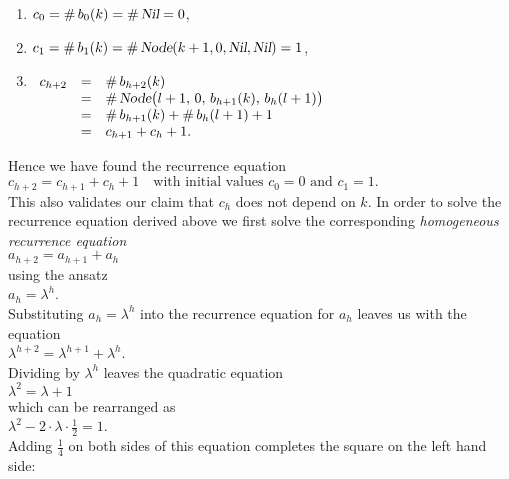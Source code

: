 \begin{enumerate}
\item $c_0 = \#\, b_0(k) = \#\, \textsl{Nil} = 0$,
\item $c_1 = \#\, b_1(k) = \#\, \textsl{Node}(k+1,0,\textsl{Nil}, \textsl{Nil}) = 1$, 
\item$\begin{array}[t]{lcl}
       c_{h+2} & = & \#\, b_{h+2}(k) \\
               & = & \#\,\textsl{Node}\bigl(l+1,\,0,\,b_{h+1}(k),\,b_h(l+1)\bigr) \\
               & = & \#\, b_{h+1}(k) + \#\, b_h(l+1) + 1 \\
               & = & c_{h+1} + c_h + 1.
       \end{array}$
\end{enumerate}
Hence we have found the recurrence equation 
\\[0.2cm]
\hspace*{1.3cm}
$c_{h+2} = c_{h+1} + c_h + 1 \quad \mbox{with initial values $c_0 = 0$ and $c_1 = 1$}.$
\\[0.2cm]
This also validates our claim that $c_h$ does not depend on $k$.  In order to solve the recurrence
equation derived above we first solve the corresponding \emph{homogeneous recurrence equation} 
\\[0.2cm]
\hspace*{1.3cm}
$a_{h+2} = a_{h+1} + a_h$
\\[0.2cm]
using the  ansatz
\\[0.2cm]
\hspace*{1.3cm}
$a_h = \lambda^h$.
\\[0.2cm]
Substituting $a_h = \lambda^h$ into the recurrence equation for $a_h$ leaves us with the equation
\\[0.2cm]
\hspace*{1.3cm}
$\lambda^{h+2} = \lambda^{h+1} + \lambda^{h}$.
\\[0.2cm]
Dividing by $\lambda^h$ leaves the quadratic equation
\\[0.2cm]
\hspace*{1.3cm}
$\lambda^2 = \lambda + 1$
\\[0.2cm]
which can be rearranged as
\\[0.2cm]
\hspace*{1.3cm}
$\lambda^2 - 2 \cdot \lambda \cdot \frac{1}{2} = 1$.
\\[0.2cm]
Adding $\frac{1}{4}$ on both sides of this equation completes the square on the left hand side:
\\[0.2cm]
